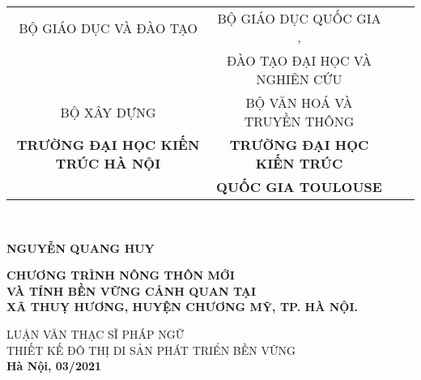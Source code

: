\documentclass[../thesis.tex]{subfiles}
\begin{document}
\begin{titlepage}

\begin{center}
\begin{table}
\small
\centering
\begin{tabular}{c c r l}
BỘ GIÁO DỤC VÀ ĐÀO TẠO  &  BỘ GIÁO DỤC QUỐC GIA ,\\
 & ĐÀO TẠO ĐẠI HỌC VÀ NGHIÊN CỨU\\ 
BỘ XÂY DỰNG & BỘ VĂN HOÁ VÀ TRUYỀN THÔNG\\
\textbf{TRƯỜNG ĐẠI HỌC KIẾN TRÚC HÀ NỘI} & \textbf{TRƯỜNG ĐẠI HỌC KIẾN TRÚC}\\
& \textbf{QUỐC GIA TOULOUSE}
\end{tabular}
\\[2cm]
\end{table}

\textbf{NGUYỄN QUANG HUY\\[2cm]}


\textbf{\large CHƯƠNG TRÌNH NÔNG THÔN MỚI\\ VÀ TÍNH BỀN VỮNG CẢNH QUAN TẠI\\ XÃ THUỴ HƯƠNG, HUYỆN CHƯƠNG MỸ, TP. HÀ NỘI.\\[2cm]}

LUẬN VĂN THẠC SĨ PHÁP NGỮ\\
THIẾT KẾ ĐÔ THỊ DI SẢN PHÁT TRIỂN BỀN VỮNG\\[8cm]


\textbf{Hà Nội, 03/2021}

\end{center}

\end{titlepage}
\end{document}
